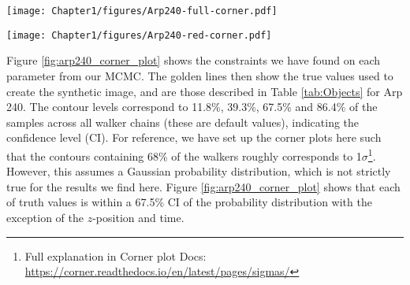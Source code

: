 \begin{figure*}
\centering
\texttt{[image: Chapter1/figures/Arp240-full-corner.pdf]}
\caption[Corner plot showing the constraints made on all thirteen parameters we are exploring.]{Corner plot showing the constraints made on all thirteen parameters we are exploring. Each contour level contains 11.8\%, 39.3\%, 67.5\% and 86.4\% of the samples across all walker chains. \DIFaddbeginFL {}\DIFaddendFL Displaying our results using the full corner plot is difficult in a paper because of the high dimensional results that we obtain. Therefore, we elect to show all remaining results in this paper as reduced corner plots like Figure \ref{fig:arp240_corner_plot}. We elect to put the parameters which are most likely to correlate together in different corner plots.\DIFdelbeginFL {}\DIFdelendFL }
\label{fig:corner_plot}
\end{figure*}

\begin{figure*}
\centering
\texttt{[image: Chapter1/figures/Arp240-red-corner.pdf]}
\caption[Same as Figure \ref{fig:corner_plot}, but reduced to only corresponding parameters.]{Same as Figure \ref{fig:corner_plot}, but reduced to only corresponding parameters.}
\label{fig:arp240_corner_plot}
\end{figure*}

Figure \ref{fig:arp240_corner_plot} shows the constraints we have found on each parameter from our MCMC. The golden lines then show the true values used to create the synthetic image, and are those described in Table \ref{tab:Objects} for Arp 240. The contour levels correspond to 11.8\%, 39.3\%, 67.5\% and 86.4\% of the samples across all walker chains (these are default values), indicating the confidence level (CI). For reference, we have set up the corner plots here such that the contours containing 68\% of the walkers roughly corresponds to 1$\sigma$\footnote{Full explanation in Corner plot Docs: \url{https://corner.readthedocs.io/en/latest/pages/sigmas/}}. However, this assumes a Gaussian probability distribution, which is not strictly true for the results we find here. \DIFaddbegin {}\DIFaddend Figure \ref{fig:arp240_corner_plot} shows that each of \DIFdelbegin {}\DIFdelend \DIFaddbegin {}\DIFaddend truth values is within a 67.5\% CI of the probability distribution with the exception of the $z$-position and time.

